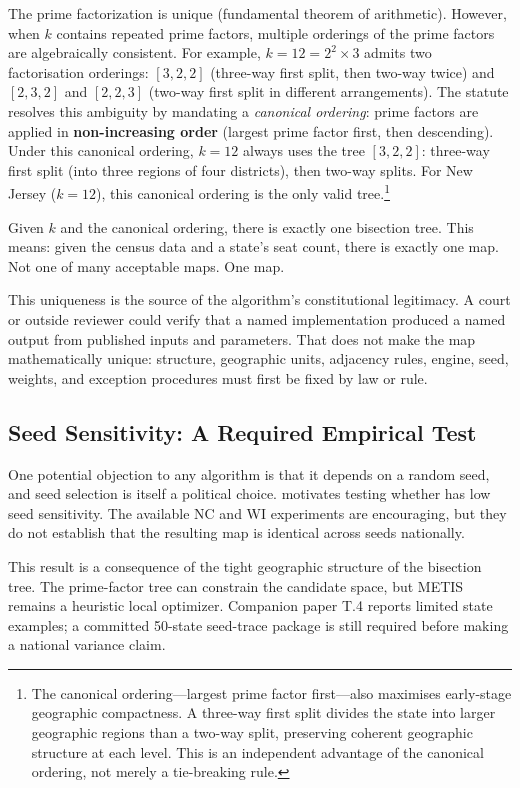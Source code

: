 The prime factorization is unique (fundamental theorem of arithmetic).
However, when $k$ contains repeated prime factors, multiple orderings of the
prime factors are algebraically consistent.
For example, $k = 12 = 2^2 \times 3$ admits two factorisation orderings:
$[3, 2, 2]$ (three-way first split, then two-way twice) and $[2, 3, 2]$ and $[2, 2, 3]$
(two-way first split in different arrangements).
The \dia{} statute resolves this ambiguity by mandating a \emph{canonical ordering}:
prime factors are applied in \textbf{non-increasing order} (largest prime factor first,
then descending).
Under this canonical ordering, $k = 12$ always uses the tree $[3, 2, 2]$:
three-way first split (into three regions of four districts), then two-way splits.
For New Jersey ($k = 12$), this canonical ordering is the only valid \ar{} tree.\footnote{%
  The canonical ordering---largest prime factor first---also maximises
  early-stage geographic compactness.
  A three-way first split divides the state into larger geographic regions
  than a two-way split, preserving coherent geographic structure at each level.
  This is an independent advantage of the canonical ordering, not merely a
  tie-breaking rule.
}

Given $k$ and the canonical ordering, there is exactly one \hh{} bisection tree.
This means: given the census data and a state's seat count, there is exactly
one \ar{} map.
Not one of many acceptable maps.
One map.

This uniqueness is the source of the algorithm's constitutional legitimacy.
A court or outside reviewer could verify that a named implementation produced
a named output from published inputs and parameters. That does not make the map
mathematically unique: structure, geographic units, adjacency rules, engine,
seed, weights, and exception procedures must first be fixed by law or rule.

\subsection{Seed Sensitivity: A Required Empirical Test}

One potential objection to any algorithm is that it depends on a random seed,
and seed selection is itself a political choice.
\citet{b11paper} motivates testing whether \ar{} has low seed sensitivity.
The available NC and WI experiments are encouraging, but they do not establish
that the resulting map is identical across seeds nationally.

This result is a consequence of the tight geographic structure of the
\hh{} bisection tree.
The prime-factor tree can constrain the candidate space, but METIS remains a
heuristic local optimizer. Companion paper T.4 reports limited state examples;
a committed 50-state seed-trace package is still required before making a
national variance claim.

